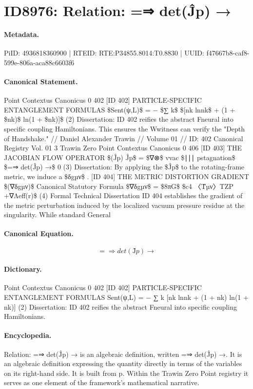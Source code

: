\section*{ID8976: Relation: =⇒ det(Ĵp) →}
\paragraph{Metadata.}
PiID: 4936818360900 | RTEID: RTE:P34855.8014:T0.8830 | UUID: f47667b8-caf8-599e-806a-aca88c6603f6

\paragraph{Canonical Statement.}
Point Contextus Canonicus 0 402 [ID 402] PARTICLE-SPECIFIC ENTANGLEMENT FORMULAS \$Sent(ψ,L)\$ = − \$∑ k\$ \$[nk lnnk\$ + (1 + \$nk)\$ ln(1 + \$nk)]\$ (2) Dissertation: ID 402 reifies the abstract Fneural into specific coupling Hamiltonians. This ensures the Wwitness can verify the "Depth of Handshake." // Daniel Alexander Trawin // Volume 01 // ID: 402 Canonical Registry Vol. 01 3 Trawin Zero Point Contextus Canonicus 0 406 [ID 403] THE JACOBIAN FLOW OPERATOR \$(Ĵp) Ĵp\$ = \$∇⊗\$ vvac \$∣∣∣ pstagnation\$ \$=⇒ det(Ĵp) →\$ 0 (3) Dissertation: By applying the \$Ĵp\$ to the rotating-frame metric, we induce a \$δgµν\$ . [ID 404] THE METRIC DISTORTION GRADIENT \$(∇δgµν)\$ Canonical Statutory Formula \$∇δgµν\$ = \$8πG\$ \$c4 〈T̂µν〉TZP +∇Λeff(r)\$ (4) Formal Technical Dissertation ID 404 establishes the gradient of the metric perturbation induced by the localized vacuum pressure residue at the singularity. While standard General

\paragraph{Canonical Equation.}
\[
=⇒ det(Ĵp) →
\]

\paragraph{Dictionary.}
Point Contextus Canonicus 0 402 [ID 402] PARTICLE-SPECIFIC ENTANGLEMENT FORMULAS Sent(ψ,L) = − ∑ k [nk lnnk + (1 + nk) ln(1 + nk)] (2) Dissertation: ID 402 reifies the abstract Fneural into specific coupling Hamiltonians.

\paragraph{Encyclopedia.}
Relation: =⇒ det(Ĵp) → is an algebraic definition, written =⇒ det(Ĵp) →. It is an algebraic definition expressing the quantity directly in terms of the variables on its right-hand side. It is built from p. Within the Trawin Zero Point registry it serves as one element of the framework's mathematical narrative.
